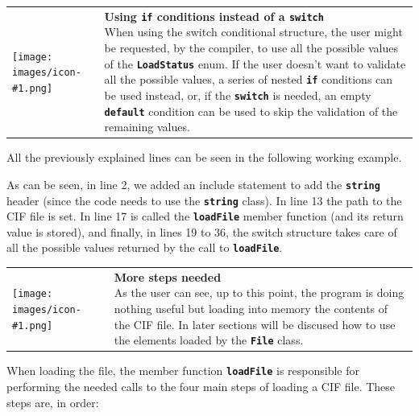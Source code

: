 \documentclass[11pt,twoside,openany,x11names,svgnames]{memoir}
\makeatletter
\newcommand{\IconNote}[3]
{
	\begin{table}[ht]
	\begin{tabular}{ lm{\dimexpr\textwidth-8\tabcolsep-\wd0}@{}}
		\toprule
		\texttt{[image: images/icon-\#1.png]}
		&
		\parbox[t]{155mm}{
		\textbf{#2} \\
		#3
		}
	\end{tabular}
\end{table}
}
\makeatother
\begin{document}
\IconNote
	{info}
	{Using \textbf{\texttt{if}} conditions instead of a \textbf{\texttt{switch}}}
	{When using the switch conditional structure, the user might be requested, by the compiler, to use all the possible values of the \textbf{\texttt{LoadStatus}} enum. If the user doesn't want to validate all the possible values, a series of nested \textbf{\texttt{if}} conditions can be used instead, or, if the \textbf{\texttt{switch}} is needed, an empty \textbf{\texttt{default}} condition can be used to skip the validation of the remaining values.}
	
All the previously explained lines can be seen in the following working example.



As can be seen, in line 2, we added an include statement to add the \textbf{\texttt{string}} header (since the code needs to use the \textbf{\texttt{string}} class). In line 13 the path to the CIF file is set. In line 17 is called the \textbf{\texttt{loadFile}} member function (and its return value is stored), and finally, in lines 19 to 36, the switch structure takes care of all the possible values returned by the call to \textbf{\texttt{loadFile}}.

\IconNote
	{info}
	{More steps needed}
	{As the user can see, up to this point, the program is doing nothing useful but loading into memory the contents of the CIF file. In later sections will be discused how to use the elements loaded by the \textbf{\texttt{File}} class.}
	
When loading the file, the member function \textbf{\texttt{loadFile}} is responsible for performing the needed calls to the four main steps of loading a CIF file. These steps are, in order:
\end{document}
